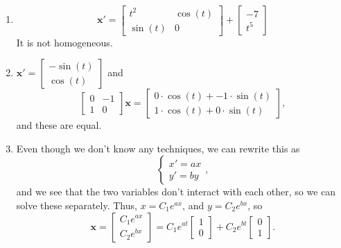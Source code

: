 \documentclass[12pt]{amsart}
\numberwithin{equation}{section}
\theoremstyle{plain} %
\theoremstyle{definition}
\theoremstyle{remark}
\begin{document}
\begin{framed}
\begin{enumerate}
\item \[ \mathbf{x'} = \begin{bmatrix} t^2 & \cos(t) \\ \sin(t) & 0 \end{bmatrix} +\begin{bmatrix} -7 \\ t^5 \end{bmatrix}\]
It is not homogeneous.
\item $\mathbf{x'} = \begin{bmatrix}  -\sin(t) \\  \cos(t)  \end{bmatrix}$ and \[ \begin{bmatrix} 0 & -1 \\ 1 & 0\end{bmatrix} \mathbf{x} = \begin{bmatrix} 0 \cdot \cos(t) + -1 \cdot \sin(t) \\ 1 \cdot \cos(t) + 0 \cdot \sin(t)\end{bmatrix},\] and these are equal.
\item Even though we don't know any techniques, we can rewrite this as 
\[  \begin{cases} x' = ax \\ y' = by\end{cases},\]
and we see that the two variables don't interact with each other, so we can solve these separately. Thus, $x= C_1 e^{ax}$, and $y= C_2 e^{bx}$, so
\[ \mathbf{x} =  \begin{bmatrix}  C_1 e^{ax} \\  C_2 e^{bx}  \end{bmatrix} = C_1 e^{at} \begin{bmatrix} 1 \\ 0 \end{bmatrix} + C_2 e^{bt}  \begin{bmatrix} 0 \\ 1 \end{bmatrix} .\]
\end{enumerate}
\end{framed}
\end{document}
